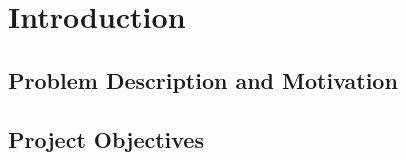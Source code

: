 ﻿\chapter{Introduction}

\section{Problem Description and Motivation}
\label{sec:problem}


\section{Project Objectives}
\label{sec:objectives}

